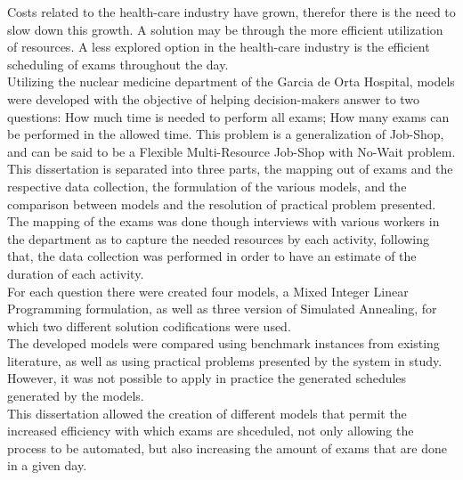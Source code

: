 
%

Costs related to the health-care industry have grown, therefor there is the need to slow down this growth. A solution may be through the more efficient utilization of resources. A less explored option in the health-care industry is the efficient scheduling of exams throughout the day.\\
Utilizing the nuclear medicine department of the Garcia de Orta Hospital, models were developed with the objective of helping decision-makers answer to two questions: How much time is needed to perform all exams; How many exams can be performed in the allowed time. This problem is a generalization of Job-Shop, and can be said to be a Flexible Multi-Resource Job-Shop with No-Wait problem.\\
This dissertation is separated into three parts, the mapping out of exams and the respective data collection, the formulation of the various models, and the comparison between models and the resolution of practical problem presented.\\
The mapping of the exams was done though interviews with various workers in the department as to capture the needed resources by each activity, following that, the data collection was performed in order to have an estimate of the duration of each activity.\\
For each question there were created four models, a Mixed Integer Linear Programming formulation, as well as three version of Simulated Annealing, for which two different solution codifications were used.\\
The developed models were compared using benchmark instances from existing literature, as well as using practical problems presented by the system in study. However, it was not possible to apply in practice the generated schedules generated by the models.\\
This dissertation allowed the creation of different models that permit the increased efficiency with which exams are shceduled, not only allowing the process to be automated, but also increasing the amount of exams that are done in a given day. 

